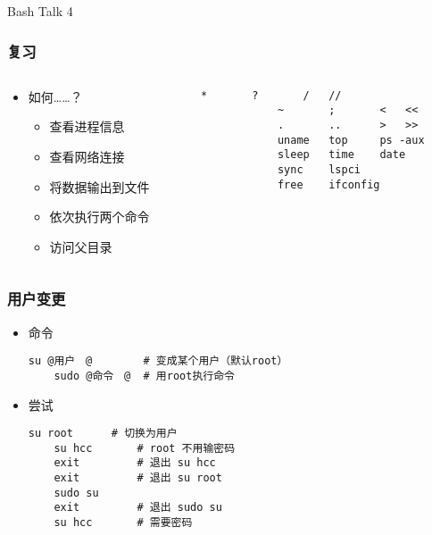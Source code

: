 


\begin{CJK}{UTF8}{gbsn}

\PreFirstFrame
\begin{frame} [fragile]
	\centerline{\fontsize{42}{42}\selectfont Bash Talk 4}
\end{frame}
\PostFirstFrame

\begin{frame} [fragile]
	\frametitle{复习}
	\linespread{1.5}
	\begin{columns}[T]
		\begin{column}[T]{.5\textwidth}
			\begin{itemize}
			\item 如何……？
				\begin{itemize}
				\item 查看进程信息
				\item 查看网络连接
				\item 将数据输出到文件
				\item 依次执行两个命令
				\item 访问父目录
				\end{itemize}
			\end{itemize}
		\end{column}
		\begin{column}[T]{.5\textwidth}
			\begin{lstlisting}[style=bashstyle, gobble=12, texcl]
			*		?		/	//
			~		;		<	<<
			.		..		>	>>
			uname	top		ps -aux
			sleep	time	date
			sync	lspci
			free	ifconfig
			\end{lstlisting}
		\end{column}
	\end{columns}
\end{frame}

\begin{frame} [fragile]
	\frametitle{用户变更}
	\linespread{1.25}
	\begin{itemize}
	\item 命令
	\begin{lstlisting}[style=bashstyle, gobble=4, texcl, escapechar=@]
	su @用户　@		# 变成某个用户（默认root）
	sudo @命令　@	# 用root执行命令
	\end{lstlisting}
	\item 尝试
	\begin{lstlisting}[style=bashstyle, gobble=4, texcl]
	su root		 # 切换为用户
	su hcc		 # root 不用输密码
	exit		 # 退出 su hcc
	exit		 # 退出 su root
	sudo su
	exit		 # 退出 sudo su
	su hcc		 # 需要密码
	\end{lstlisting}
	\end{itemize}
\end{frame}


\end{CJK}
